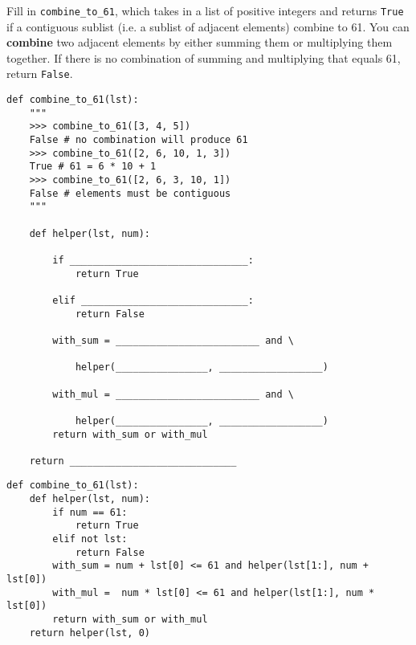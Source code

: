 \begin{blocksection}
\question
Fill in \lstinline{combine_to_61}, which takes in a list of positive integers and returns \lstinline{True} if a contiguous sublist (i.e. a sublist of adjacent elements) combine to 61. You can \textbf{combine} two adjacent elements by either summing them or multiplying them together. If there is no combination of summing and multiplying that equals 61, return \lstinline{False}.

\begin{lstlisting}
def combine_to_61(lst):
    """
    >>> combine_to_61([3, 4, 5])
    False # no combination will produce 61
    >>> combine_to_61([2, 6, 10, 1, 3])
    True # 61 = 6 * 10 + 1
    >>> combine_to_61([2, 6, 3, 10, 1])
    False # elements must be contiguous
    """

    def helper(lst, num):

        if _______________________________:
            return True

        elif _____________________________:
            return False

        with_sum = _________________________ and \

            helper(________________, __________________)

        with_mul = _________________________ and \

            helper(________________, __________________)
        return with_sum or with_mul

    return _____________________________
\end{lstlisting}
\end{blocksection}

\begin{blocksection}
\begin{solution}
\begin{lstlisting}
def combine_to_61(lst): 
    def helper(lst, num): 	
        if num == 61: 
            return True 
        elif not lst: 
            return False 
        with_sum = num + lst[0] <= 61 and helper(lst[1:], num + lst[0]) 
        with_mul =  num * lst[0] <= 61 and helper(lst[1:], num * lst[0]) 
        return with_sum or with_mul 
    return helper(lst, 0)
\end{lstlisting}
\end{solution}
\end{blocksection}